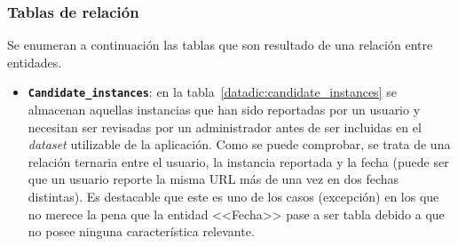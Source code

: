 \subsubsection{Tablas de relación}

Se enumeran a continuación las tablas que son resultado de una relación entre entidades.

\begin{itemize}
	\item \textbf{\texttt{Candidate\_instances}}: en la tabla~\ref{datadic:candidate_instances} se almacenan aquellas instancias que han sido reportadas por un usuario y necesitan ser revisadas por un administrador antes de ser incluidas en el \textit{dataset} utilizable de la aplicación. Como se puede comprobar, se trata de una relación ternaria entre el usuario, la instancia reportada y la fecha (puede ser que un usuario reporte la misma URL más de una vez en dos fechas distintas). Es destacable que este es uno de los casos (excepción) en los que no merece la pena que la entidad <<Fecha>> pase a ser tabla debido a que no posee ninguna característica relevante.
	
		\begin{table}
		\caption[Diccionario de datos: Candidate\_instances]{Diccionario de datos: tabla correspondiente a la clase \texttt{Candidate\_instances}.}
		\label{datadic:candidate_instances}
		\end{table}


\end{itemize}
